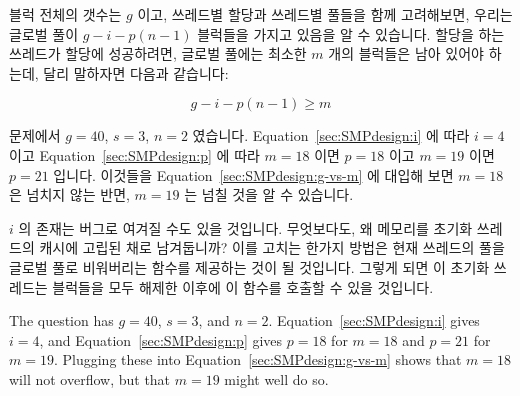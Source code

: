 \begin{enumerate}
	블럭 전체의 갯수는 $g$ 이고, 쓰레드별 할당과 쓰레드별 풀들을 함께
	고려해보면, 우리는 글로벌 풀이 $g-i-p(n-1)$ 블럭들을 가지고 있음을 알
	수 있습니다.
	할당을 하는 쓰레드가 할당에 성공하려면, 글로벌 풀에는 최소한 $m$ 개의
	블럭들은 남아 있어야 하는데, 달리 말하자면 다음과 같습니다:

	\begin{equation}
		g - i - p(n - 1) \ge m
	\label{sec:SMPdesign:g-vs-m}
	\end{equation}

	문제에서 $g=40$, $s=3$, $n=2$ 였습니다.
	Equation~\ref{sec:SMPdesign:i} 에 따라 $i=4$ 이고
	Equation~\ref{sec:SMPdesign:p} 에 따라 $m=18$ 이면 $p=18$ 이고 $m=19$
	이면 $p=21$ 입니다.
	이것들을 Equation~\ref{sec:SMPdesign:g-vs-m} 에 대입해 보면 $m=18$ 은
	넘치지 않는 반면, $m=19$ 는 넘칠 것을 알 수 있습니다.

	$i$ 의 존재는 버그로 여겨질 수도 있을 것입니다.
	무엇보다도, 왜 메모리를 초기화 쓰레드의 캐시에 고립된 채로 남겨둡니까?
	이를 고치는 한가지 방법은 현재 쓰레드의 풀을 글로벌 풀로 비워버리는
	 함수를 제공하는 것이 될 것입니다.
	그렇게 되면 이 초기화 쓰레드는 블럭들을 모두 해제한 이후에 이 함수를
	호출할 수 있을 것입니다.
	\iffalse

	The question has $g=40$, $s=3$, and $n=2$.
	Equation~\ref{sec:SMPdesign:i} gives $i=4$, and
	Equation~\ref{sec:SMPdesign:p} gives $p=18$ for $m=18$
	and $p=21$ for $m=19$.
	Plugging these into Equation~\ref{sec:SMPdesign:g-vs-m}
	shows that $m=18$ will not overflow, but that $m=19$ might
	well do so.


\end{enumerate}
